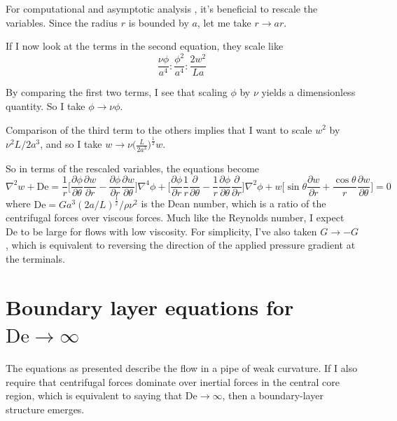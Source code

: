\documentclass[10pt,a4paper]{report}
\begin{document}
For computational and asymptotic analysis , it's beneficial to rescale the variables. Since the radius $r$ is bounded by $a$, let me take $r \rightarrow a r$.

If I now look at the terms in the second equation, they scale like
\begin{equation*}
\frac{\nu \phi}{a^4} : \frac{\phi^2}{a^4} : \frac{2 w^2}{L a}
\end{equation*}

By comparing the first two terms, I see that scaling $\phi$ by $\nu$ yields a dimensionless quantity. So I take $\phi \rightarrow \nu \phi$.

Comparison of the third term to the others implies that I want to scale $w^2$ by $\nu^2 L / 2 a^3$, and so I take $w \rightarrow \nu \big(\frac{L}{2 a^3}\big)^\frac{1}{2} w$.

So in terms of the rescaled variables, the equations become
\begin{subequations}\label{curved}
\begin{equation}\label{curved1}
\nabla^2 w + \textrm{De} = \frac{1}{r} \bigg[\frac{\partial \phi}{\partial \theta} \frac{\partial w}{\partial r} - \frac{\partial \phi}{\partial r} \frac{\partial w}{\partial \theta}\bigg]
\end{equation}
\begin{equation}\label{curved2}
\nabla^4 \phi + \bigg[\frac{\partial \phi}{\partial r} \frac{1}{r} \frac{\partial}{\partial \theta} - \frac{1}{r} \frac{\partial \phi}{\partial \theta} \frac{\partial}{\partial r} \bigg] \nabla^2 \phi + w \bigg[\sin \theta \frac{\partial w}{\partial r} + \frac{\cos \theta}{r} \frac{\partial w}{\partial \theta} \bigg] = 0
\end{equation}
\end{subequations}
where $\textrm{De} = G a^3 (2 a / L)^\frac{1}{2} / \rho \nu^2$ is the Dean number, which is a ratio of the centrifugal forces over viscous forces. Much like the Reynolds number, I expect $\textrm{De}$ to be large for flows with low viscosity. For simplicity, I've also taken $G \rightarrow -G$, which is equivalent to reversing the direction of the applied pressure gradient at the terminals.

\section{Boundary layer equations for $\textrm{De} \rightarrow \infty$}

The equations as presented describe the flow in a pipe of weak curvature. If I also require that centrifugal forces dominate over inertial forces in the central core region, which is equivalent to saying that $\textrm{De} \rightarrow \infty$, then a boundary-layer structure emerges.
\end{document}
